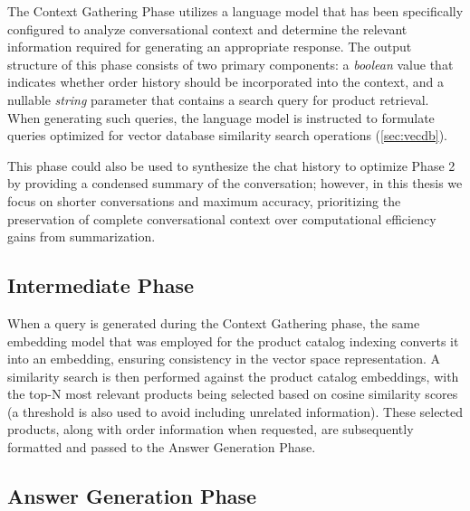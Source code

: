 The Context Gathering Phase utilizes a language model that has been specifically configured to analyze conversational context and determine the relevant information required for generating an appropriate response.
The output structure of this phase consists of two primary components: a \textit{boolean} value that indicates whether order history should be incorporated into the context, and a nullable \textit{string} parameter that contains a search query for product retrieval.
When generating such queries, the language model is instructed to formulate queries optimized for vector database similarity search operations (\cref{sec:vecdb}).

This phase could also be used to synthesize the chat history to optimize Phase 2 by providing a condensed summary of the conversation; however, in this thesis we focus on shorter conversations and maximum accuracy, prioritizing the preservation of complete conversational context over computational efficiency gains from summarization.

\subsection{Intermediate Phase}
\label{sec:intermediate}

When a query is generated during the Context Gathering phase, the same embedding model that was employed for the product catalog indexing converts it into an embedding, ensuring consistency in the vector space representation.
A similarity search is then performed against the product catalog embeddings, with the top-N most relevant products being selected based on cosine similarity scores (a threshold is also used to avoid including unrelated information).
These selected products, along with order information when requested, are subsequently formatted and passed to the Answer Generation Phase.

\subsection{Answer Generation Phase}
\label{sec:answer-generation}

